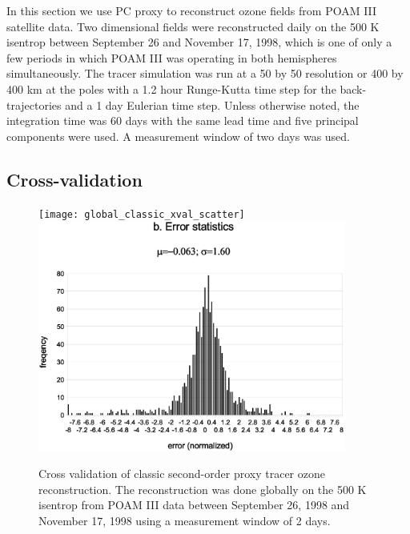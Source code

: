 \documentclass{article}
\begin{document}
In this section we use PC proxy to reconstruct ozone fields from POAM III
satellite data.
Two dimensional fields were reconstructed daily on the 500 K isentrop
between September 26 and November 17, 1998,
which is one of only a few periods in which POAM III was operating in both 
hemispheres simultaneously.
The tracer simulation was run at a 50 by 50 resolution or 400 by 400 km at
the poles with a 1.2 hour Runge-Kutta time step for the back-trajectories
and a 1 day Eulerian time step.
Unless otherwise noted, the integration time was 60 days with the same lead time
and five principal components were used.
A measurement window of two days was used.

\subsection{Cross-validation}

\begin{figure}
  \centering
  \texttt{[image: global\_classic\_xval\_scatter]}
  \includegraphics[width=0.9\textwidth]{global_classic_xval_error}
  \caption{Cross validation of classic second-order proxy tracer ozone reconstruction. The reconstruction was done globally on the 500 K isentrop from POAM III data between September 26, 1998 and November 17, 1998 using a measurement window of 2 days.}
  \label{classic_cross_validation}
\end{figure}
\end{document}
